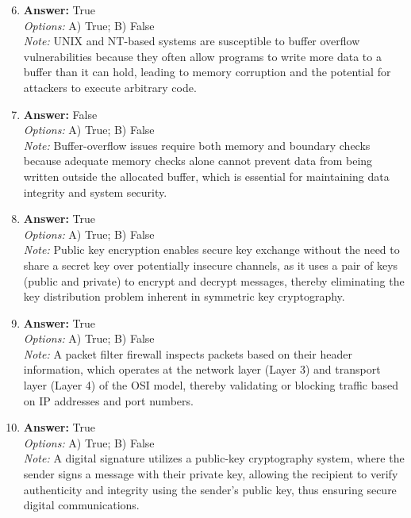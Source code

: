 \documentclass[12pt]{article}
\begin{document}
\begin{enumerate}[label=\arabic*.]
\setcounter{enumi}{5}
\item \textbf{Answer:} True
\\ \textit{Options:} A) True; B) False
\\ \textit{Note:} UNIX and NT-based systems are susceptible to buffer overflow vulnerabilities because they often allow programs to write more data to a buffer than it can hold, leading to memory corruption and the potential for attackers to execute arbitrary code.
\item \textbf{Answer:} False
\\ \textit{Options:} A) True; B) False
\\ \textit{Note:} Buffer-overflow issues require both memory and boundary checks because adequate memory checks alone cannot prevent data from being written outside the allocated buffer, which is essential for maintaining data integrity and system security.
\item \textbf{Answer:} True
\\ \textit{Options:} A) True; B) False
\\ \textit{Note:} Public key encryption enables secure key exchange without the need to share a secret key over potentially insecure channels, as it uses a pair of keys (public and private) to encrypt and decrypt messages, thereby eliminating the key distribution problem inherent in symmetric key cryptography.
\item \textbf{Answer:} True
\\ \textit{Options:} A) True; B) False
\\ \textit{Note:} A packet filter firewall inspects packets based on their header information, which operates at the network layer (Layer 3) and transport layer (Layer 4) of the OSI model, thereby validating or blocking traffic based on IP addresses and port numbers.
\item \textbf{Answer:} True
\\ \textit{Options:} A) True; B) False
\\ \textit{Note:} A digital signature utilizes a public-key cryptography system, where the sender signs a message with their private key, allowing the recipient to verify authenticity and integrity using the sender's public key, thus ensuring secure digital communications.
\end{enumerate}
\end{document}

